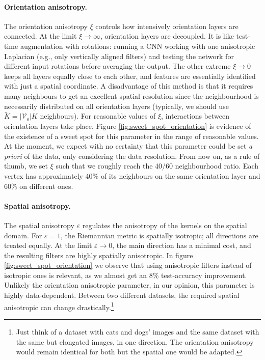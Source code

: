 \documentclass{article}
\begin{document}
\paragraph{Orientation anisotropy.} The orientation anisotropy $\xi$ controls how intensively orientation layers are connected. At the limit $\xi \to \infty$, orientation layers are decoupled. It is like test-time augmentation with rotations: running a CNN working with one anisotropic Laplacian (e.g., only vertically aligned filters) and testing the network for different input rotations before averaging the output. The other extreme $\xi \to 0$ keeps all layers equally close to each other, and features are essentially identified with just a spatial coordinate. A disadvantage of this method is that it requires many neighbours to get an excellent spatial resolution since the neighbourhood is necessarily distributed on all orientation layers (typically, we should use $\tilde{K} = |\mathcal{V}_o| K$ neighbours). For reasonable values of $\xi$, interactions between orientation layers take place. Figure \ref{fig:sweet_spot_orientation} is evidence of the existence of a sweet spot for this parameter in the range of reasonable values. At the moment, we expect with no certainty that this parameter could be set \emph{a priori} of the data, only considering the data resolution. From now on, as a rule of thumb, we set $\xi$ such that we roughly reach the 40/60 neighbourhood ratio. Each vertex has approximately 40\% of its neighbours on the same orientation layer and 60\% on different ones.

\paragraph{Spatial anisotropy.} The spatial anisotropy $\varepsilon$ regulates the anisotropy of the kernels on the spatial domain. For $\varepsilon = 1$, the Riemannian metric is spatially isotropic; all directions are treated equally. At the limit $\varepsilon \to 0$, the main direction has a minimal cost, and the resulting filters are highly spatially anisotropic. In figure \ref{fig:sweet_spot_orientation} we observe that using anisotropic filters instead of isotropic ones is relevant, as we almost get an 8\% test-accuracy improvement. Unlikely the orientation anisotropic parameter, in our opinion, this parameter is highly data-dependent. Between two different datasets, the required spatial anisotropic can change drastically.\footnote{Just think of a dataset with cats  and dogs' images and the same dataset with the same but elongated images, in one direction. The orientation anisotropy would remain identical for both but the spatial one would be adapted.}
\end{document}
